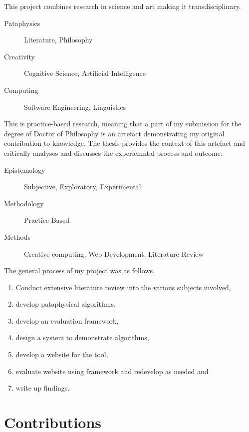 This project combines research in science and art making it transdisciplinary.

\begin{description}
  \item [Pataphysics] Literature, Philosophy
  \item [Creativity] Cognitive Science, Artificial Intelligence
  \item [Computing] Software Engineering, Linguistics
\end{description}

This is practice-based research, meaning that a part of my submission for the degree of Doctor of Philosophy is an artefact demonstrating my original contribution to knowledge. The thesis provides the context of this artefact and critically analyses and discusses the experiemntal process and outcome.


\begin{description}
  \item [Epistemology] Subjective, Exploratory, Experimental
  \item [Methodology] Practice-Based
  \item [Methods] Creative computing, Web Development, Literature Review
\end{description}


The general process of my project was as follows.

\begin{enumerate}
  \item Conduct extensive literature review into the various subjects involved,
  \item develop pataphysical algorithms,
  \item develop an evaluation framework,
  \item design a system to demonstrate algorithms,
  \item develop a website for the tool,
  \item evaluate website using framework and redevelop as needed and
  \item write up findings.
\end{enumerate}


\section{Contributions}

